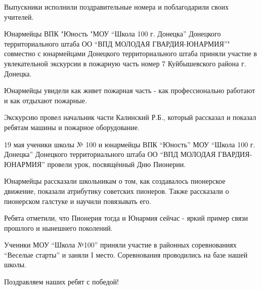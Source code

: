 Выпускники исполнили поздравительные номера и поблагодарили своих учителей.



Юнармейцы ВПК "Юность "МОУ \enquote{Школа 100 г. Донецка} Донецкого территориального
штаба ОО \enquote{ВПД МОЛОДАЯ ГВАРДИЯ-ЮНАРМИЯ}" совместно с юнармейцами Донецкого
территориального штаба приняли участие в увлекательной экскурсии в пожарную
часть номер 7 Куйбышевского района г. Донецка.

Юнармейцы увидели как живет пожарная часть - как профессионально работают и как
отдыхают пожарные.

Экскурсию провел начальник части Калинский Р.Б., который  рассказал и показал
ребятам машины и пожарное оборудование. 



19 мая ученики школы № 100 и  юнармейцы ВПК \enquote{Юность} МОУ \enquote{Школа
100 г. Донецка} Донецкого территориального штаба ОО \enquote{ВПД МОЛОДАЯ
ГВАРДИЯ-ЮНАРМИЯ} провели урок, посвящённый Дню Пионерии.

Юнармейцы рассказали школьникам о том, как создавалось пионерское движение,
показали атрибутику советских пионеров. Также рассказали о пионерском галстуке
и научили повязывать его.

Ребята отметили, что Пионерия тогда и Юнармия сейчас -  яркий пример связи
прошлого и нынешнего поколений.



Ученики МОУ \enquote{Школа №100} приняли участие в районных соревнованиях \enquote{Веселые
старты} и заняли I место. Соревнования проводились на базе нашей школы.

Поздравляем наших ребят с победой!



